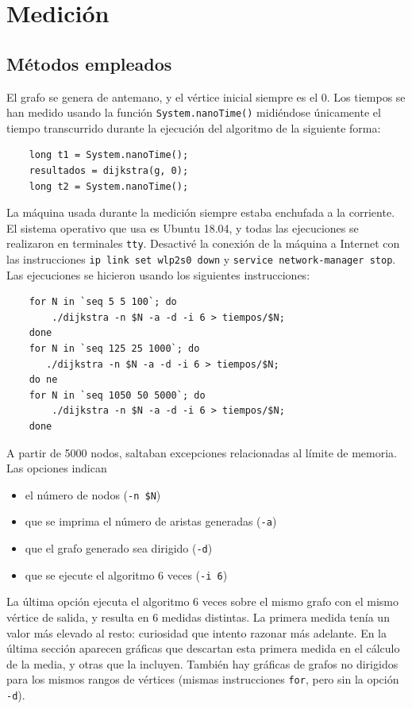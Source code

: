 \documentclass[12pt , a4paper]{article}
\begin{document}
\section{Medición}
\subsection{Métodos empleados}
	El grafo se genera de antemano, y el vértice inicial siempre es el 0. Los tiempos se han medido usando la función \texttt{System.nanoTime()} midiéndose únicamente el tiempo transcurrido durante la ejecución del algoritmo de la siguiente forma:
	\begin{verbatim}
	long t1 = System.nanoTime();
	resultados = dijkstra(g, 0);
	long t2 = System.nanoTime();
	\end{verbatim}
	
	La máquina usada durante la medición siempre estaba enchufada a la corriente. El sistema operativo que usa es Ubuntu 18.04, y todas las ejecuciones se realizaron en terminales \texttt{tty}. Desactivé la conexión de la máquina a Internet con las instrucciones \texttt{ip link set wlp2s0 down} y \texttt{service network-manager stop}. Las ejecuciones se hicieron usando los siguientes instrucciones:
	\begin{verbatim}
	for N in `seq 5 5 100`; do 
	    ./dijkstra -n $N -a -d -i 6 > tiempos/$N; 
	done
	for N in `seq 125 25 1000`; do 
	   ./dijkstra -n $N -a -d -i 6 > tiempos/$N;
	do ne
	for N in `seq 1050 50 5000`; do 
	    ./dijkstra -n $N -a -d -i 6 > tiempos/$N; 
	done
	\end{verbatim}
	A partir de 5000 nodos, saltaban excepciones relacionadas al límite de memoria. Las opciones indican
	\begin{itemize}
		\item el número de nodos (\texttt{-n \$N})
		\item que se imprima el número de aristas generadas (\texttt{-a})
		\item que el grafo generado sea dirigido (\texttt{-d})
		\item que se ejecute el algoritmo 6 veces (\texttt{-i 6})
	\end{itemize} 
	La última opción ejecuta el algoritmo 6 veces sobre el mismo grafo con el mismo vértice de salida, y resulta en 6 medidas distintas. La primera medida tenía un valor más elevado al resto: curiosidad que intento razonar más adelante. En la última sección aparecen gráficas que descartan esta primera medida en el cálculo de la media, y otras que la incluyen. También hay gráficas de grafos no dirigidos para los mismos rangos de vértices (mismas instrucciones \texttt{for}, pero sin la opción \texttt{-d}).
	
\end{document}
